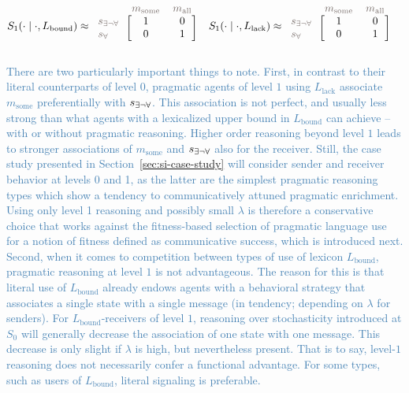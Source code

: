 \documentclass[a4paper, 11pt]{article}
\theoremstyle{Satz}
\newcommand{\rvv}[1]{\textcolor{Steelblue}{#1}}%
\newcommand{\state}{\ensuremath{s}\xspace}		%
\newcommand{\mystate}[1]{\ensuremath{\state_{\text{#1}}}\xspace} %
\newcommand{\mylang}[1]{\ensuremath{L_{\text{#1}}}\xspace} %
\newcommand{\messg}{\ensuremath{m}\xspace}		%
\newcommand{\mymessg}[1]{\ensuremath{\messg_{\text{#1}}}\xspace} %
\newcommand{\ssome}{\mystate{\ensuremath{\exists\neg\forall}}}
\newcommand{\sall}{\mystate{\ensuremath{\forall}}}
\newcommand{\msome}{\mymessg{some}}
\newcommand{\mall}{\mymessg{all}}
\newcommand{\Lbound}{\mylang{bound}}
\newcommand{\Llack}{\mylang{lack}}
\newcommand{\mygray}[1]{{\textcolor{mygray}{#1}}}
\begin{document}
\begin{align*}
  S_1(\cdot \mid \cdot, \Lbound) & \approx \begin{blockarray}{lcc}
    & \mygray{\msome} & \mygray{\mall} \\
    \begin{block}{l[cc]}
      \mygray{\ssome} & 1 & 0 \\
      \mygray{\sall}  & 0 & 1 \\
    \end{block}
  \end{blockarray} &
  S_1(\cdot \mid \cdot, \Llack) & \approx \begin{blockarray}{lcc}
    & \mygray{\msome} & \mygray{\mall} \\
    \begin{block}{l[cc]}
      \mygray{\ssome} & 1 & 0 \\
      \mygray{\sall}  & 0 & 1 \\
    \end{block}
  \end{blockarray} 
\end{align*}


\rvv{There are two particularly important things to note. First, in contrast to their literal counterparts of level $0$, pragmatic agents of level $1$ using $\Llack$ associate $\msome$ preferentially with $\ssome$. This association is not perfect, and usually less strong than what agents with a lexicalized upper bound in $\Lbound$ can achieve -- with or without pragmatic reasoning. Higher order reasoning beyond level $1$ leads to stronger associations of $\msome$ and $\ssome$ also for the receiver. Still, the case study presented in Section~\ref{sec:si-case-study} will consider
sender and receiver behavior at levels 0 and 1, as the latter are the simplest pragmatic reasoning types which show a tendency to communicatively attuned pragmatic enrichment. Using only level 1 reasoning and possibly small $\lambda$ is therefore a conservative choice that works against the fitness-based selection of pragmatic language use for a notion of fitness defined as communicative success, which is introduced next. Second, when it comes to competition between types of use of lexicon $\Lbound$, pragmatic reasoning at level $1$ is not advantageous. The reason for this is that literal use of $\Lbound$ already endows agents with a behavioral strategy that associates a single state with a single message (in tendency; depending on $\lambda$ for senders). For $\Lbound$-receivers of level $1$, reasoning over stochasticity introduced at $S_0$ will generally decrease the association of one state with one message. This decrease is only slight if $\lambda$ is high, but nevertheless present. That is to say, level-$1$ reasoning does not necessarily confer a functional advantage. For some types, such as users of $\Lbound$, literal signaling is preferable.}
\end{document}
